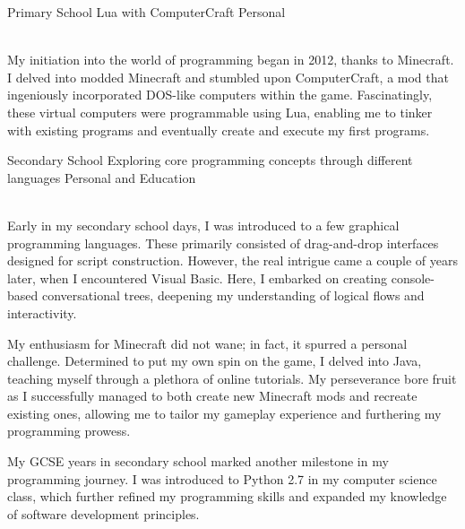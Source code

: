\documentclass[9pt]{developercv} %
\begin{document}
\vspace{1cm}	



\begin{entrylist}
	\entry
		{Primary School}
		{Lua with ComputerCraft}
		{Personal}
		{\\
			My initiation into the world of programming began in 2012, thanks to Minecraft. I delved into modded Minecraft and stumbled upon ComputerCraft, a mod that ingeniously incorporated DOS-like computers within the game. Fascinatingly, these virtual computers were programmable using Lua, enabling me to tinker with existing programs and eventually create and execute my first programs.

			\vspace{0.5cm}
		}
	\entry
		{Secondary School}
		{Exploring core programming concepts through different languages}
		{Personal and Education}
		{\\
			Early in my secondary school days, I was introduced to a few graphical programming languages. These primarily consisted of drag-and-drop interfaces designed for script construction. However, the real intrigue came a couple of years later, when I encountered Visual Basic. Here, I embarked on creating console-based conversational trees, deepening my understanding of logical flows and interactivity.

			\vspace{0.5cm}

			My enthusiasm for Minecraft did not wane; in fact, it spurred a personal challenge. Determined to put my own spin on the game, I delved into Java, teaching myself through a plethora of online tutorials. My perseverance bore fruit as I successfully managed to both create new Minecraft mods and recreate existing ones, allowing me to tailor my gameplay experience and furthering my programming prowess.

			\vspace{0.5cm}

			My GCSE years in secondary school marked another milestone in my programming journey. I was introduced to Python 2.7 in my computer science class, which further refined my programming skills and expanded my knowledge of software development principles.

}
\end{entrylist}
\end{document}
